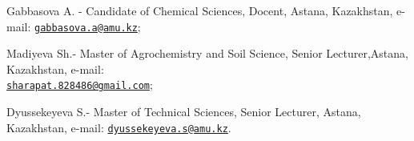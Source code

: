 \begin{authorinfo}
Gabbasova A. - Candidate of Chemical Sciences, Docent, Astana,
Kazakhstan, e-mail:
\href{mailto:gabbasova.a@amu.kz}{\nolinkurl{gabbasova.a@amu.kz}};

Madiyeva Sh.- Master of Agrochemistry and Soil Science, Senior
Lecturer,Astana, Kazakhstan, e-mail:\\
\href{mailto:sharapat.828486@gmail.com}{\nolinkurl{sharapat.828486@gmail.com}};

Dyussekeyeva S.- Master of Technical Sciences, Senior Lecturer, Astana,
Kazakhstan, e-mail:
\href{mailto:dyussekeyeva.s@amu.kz}{\nolinkurl{dyussekeyeva.s@amu.kz}}.
\end{authorinfo}
